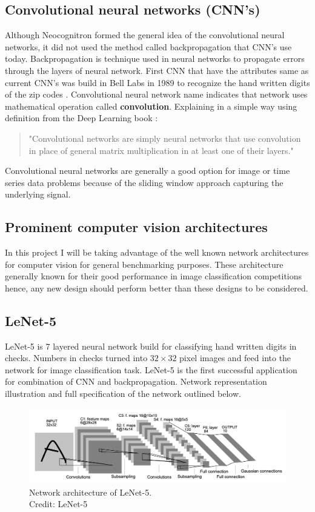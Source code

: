 \documentclass[12pt, twoside, a4paper]{article}
\begin{document}
\subsection{Convolutional neural networks (CNN's)}
Although Neocognitron formed the general idea of the convolutional neural networks, it did not used the method called backpropagation that CNN's use today. Backpropagation is technique used in neural networks to propagate errors through the layers of neural network. First CNN that have the attributes same as current CNN's was build in Bell Labs in 1989 to recognize the hand written digits of the zip codes \cite{cnnzipcodes}. Convolutional neural network name indicates that network uses mathematical operation called \textbf{convolution}. Explaining in a simple way using definition from the Deep Learning book \cite{deeplearningbook}:

\begin{quote}
    "Convolutional networks are simply neural networks that use convolution in place of general matrix multiplication in at least one of their layers."
\end{quote}

Convolutional neural networks are generally a good option for image or time series data problems because of the sliding window approach capturing the underlying signal.

\subsection{Prominent computer vision architectures}
In this project I will be taking advantage of the well known network architectures for computer vision for general benchmarking purposes. These architecture generally known for their good performance in image classification competitions hence, any new design should perform better than these designs to be considered. 

\subsection{LeNet-5}
LeNet-5 \cite{Lenet5} is 7 layered neural network build for classifying hand written digits in checks. Numbers in checks turned into  $32 \times 32$ pixel images and feed into the network for image classification task. LeNet-5 is the first successful application for combination of CNN and backpropagation. Network representation illustration and full specification of the network outlined below.

\begin{figure}[H]%
    \centering
    \includegraphics[width=\textwidth]{img/lenet-5.png}%
    \caption{Network architecture of LeNet-5.\\Credit: LeNet-5 \cite{Lenet5}}%
    \label{fig:lenet5}%
\end{figure}
\end{document}
